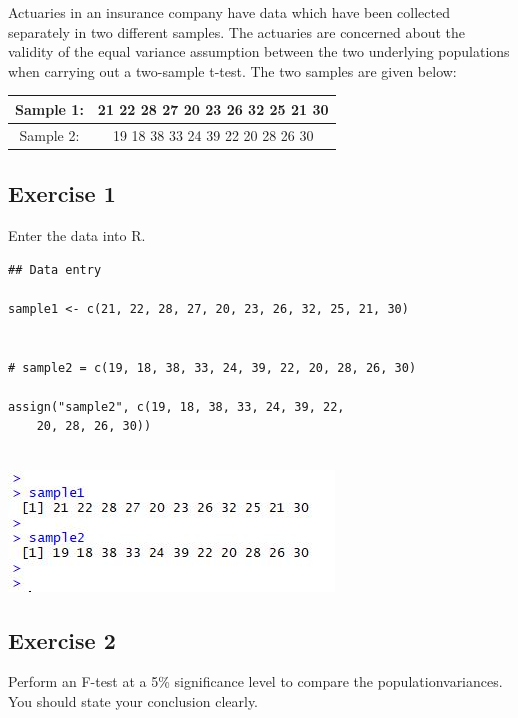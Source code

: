 \documentclass[a4paper,12pt]{article}
\begin{document}
\large 
\noindent Actuaries in an insurance company have data which have been collected separately
in two different samples. The actuaries are concerned about the validity of the equal
variance assumption between the two underlying populations when carrying out a
two-sample t-test. The two samples are given below:

\begin{center}
\begin{tabular}{|c|c|}
\hline
 Sample 1:     &  21 22 28 27 20 23 26 32 25 21 30\\ \hline
 Sample 2:    & 19 18 38 33 24 39 22 20 28 26 30 \\
 \hline 
\end{tabular}
\end{center}

\subsection*{Exercise 1}

Enter the data into R.



\begin{framed}\begin{verbatim}
## Data entry

sample1 <- c(21, 22, 28, 27, 20, 23, 26, 32, 25, 21, 30)


# sample2 = c(19, 18, 38, 33, 24, 39, 22, 20, 28, 26, 30)

assign("sample2", c(19, 18, 38, 33, 24, 39, 22,
    20, 28, 26, 30))


\end{verbatim}\end{framed}
\newpage 
\includegraphics[scale=1.6]{00-A1/images/A1-Q4-Samples.JPG}

\newpage 

\subsection*{Exercise 2}

\noindent Perform an F-test at a 5\% significance level to compare the populationvariances. You should state your conclusion clearly.
\end{document}

